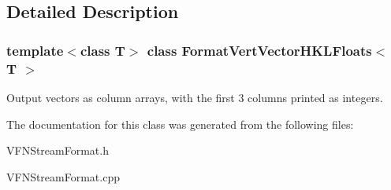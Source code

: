 \subsection{Detailed Description}
\subsubsection*{template$<$class T$>$\newline
class Format\+Vert\+Vector\+H\+K\+L\+Floats$<$ T $>$}

Output vectors as column arrays, with the first 3 columns printed as integers.


\begin{DoxyCode}{0}
\end{DoxyCode}
 

The documentation for this class was generated from the following files\+:\begin{DoxyCompactItemize}
\item 
V\+F\+N\+Stream\+Format.\+h\item 
V\+F\+N\+Stream\+Format.\+cpp\end{DoxyCompactItemize}
